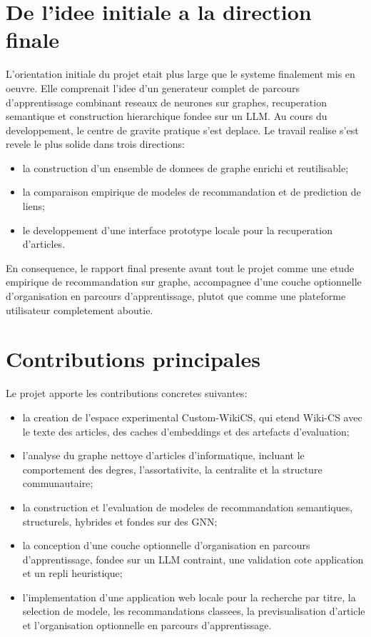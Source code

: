 \section{De l'idee initiale a la direction finale}

L'orientation initiale du projet etait plus large que le systeme finalement
mis en oeuvre. Elle comprenait l'idee d'un generateur complet de parcours
d'apprentissage combinant reseaux de neurones sur graphes, recuperation
semantique et construction hierarchique fondee sur un LLM. Au cours du
developpement, le centre de gravite pratique s'est deplace. Le travail realise
s'est revele le plus solide dans trois directions:
\begin{itemize}
    \item la construction d'un ensemble de donnees de graphe enrichi et reutilisable;
    \item la comparaison empirique de modeles de recommandation et de prediction
    de liens;
    \item le developpement d'une interface prototype locale pour la recuperation
    d'articles.
\end{itemize}

En consequence, le rapport final presente avant tout le projet comme une etude
empirique de recommandation sur graphe, accompagnee d'une couche optionnelle
d'organisation en parcours d'apprentissage, plutot que comme une plateforme
utilisateur completement aboutie.

\section{Contributions principales}

Le projet apporte les contributions concretes suivantes:
\begin{itemize}
    \item la creation de l'espace experimental Custom-WikiCS, qui etend Wiki-CS
    avec le texte des articles, des caches d'embeddings et des artefacts
    d'evaluation;
    \item l'analyse du graphe nettoye d'articles d'informatique, incluant le
    comportement des degres, l'assortativite, la centralite et la structure
    communautaire;
    \item la construction et l'evaluation de modeles de recommandation
    semantiques, structurels, hybrides et fondes sur des GNN;
    \item la conception d'une couche optionnelle d'organisation en parcours
    d'apprentissage, fondee sur un LLM contraint, une validation cote
    application et un repli heuristique;
    \item l'implementation d'une application web locale pour la recherche par
    titre, la selection de modele, les recommandations classees, la
    previsualisation d'article et l'organisation optionnelle en parcours
    d'apprentissage.
\end{itemize}

